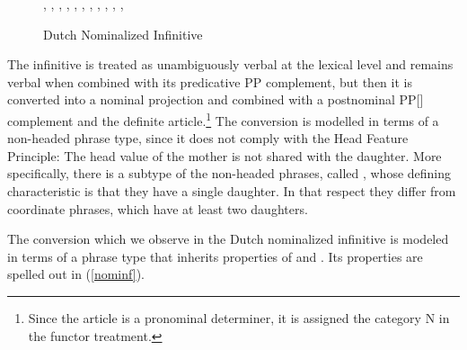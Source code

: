 \documentclass[output=paper]{langsci/langscibook}
\begin{document}
\begin{figure}
\begin{center}
\footnotesize
\tree
{,
  {,
    {}},
  {,
    {,
      {,
        {,
          {}},
        {,
          {}}}},
    {, 
      {}}}}
\caption{\label{kust} Dutch Nominalized Infinitive }
\normalsize
\end{center}
\end{figure}    

The infinitive is treated as unambiguously verbal at the lexical level and 
remains verbal when combined with its predicative PP complement, but then it  
is converted into a nominal projection and combined with a postnominal PP[]
complement and the definite article.\footnote{Since the article is a pronominal 
determiner, it is assigned the category N in the functor treatment.}     
The conversion is modelled in terms of a non-headed phrase type, 
since it does not comply with the Head Feature Principle: 
The {\sc head} value of the mother is not shared with the daughter.  
More specifically, there is a subtype of the non-headed phrases, called , 
whose defining characteristic is that they have a single daughter. 
In that respect they differ from coordinate phrases, which have at least two daughters.  

\begin{exe} 
\ex\label{conv} 
\begin{avm} 
\end{avm}
\end{exe}

\noindent
The conversion which we observe in the Dutch nominalized infinitive is modeled 
in terms of a phrase type that inherits properties of  and 
. Its properties are spelled out in (\ref{nominf}). 
\end{document}
